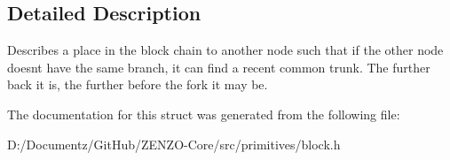 \subsection{Detailed Description}
Describes a place in the block chain to another node such that if the other node doesn\textquotesingle{}t have the same branch, it can find a recent common trunk. The further back it is, the further before the fork it may be. 

The documentation for this struct was generated from the following file\+:\begin{DoxyCompactItemize}
\item 
D\+:/\+Documentz/\+Git\+Hub/\+Z\+E\+N\+Z\+O-\/\+Core/src/primitives/block.\+h\end{DoxyCompactItemize}
